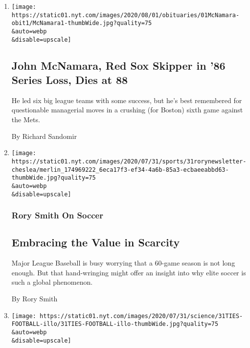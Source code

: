 \begin{enumerate}
\def\labelenumi{\arabic{enumi}.}
\item
  \href{/2020/07/31/sports/baseball/john-mcnamara-dead.html}{}

  \texttt{[image: https://static01.nyt.com/images/2020/08/01/obituaries/01McNamara-obit1/McNamara1-thumbWide.jpg?quality=75\\\&auto=webp\\\&disable=upscale]}

  \hypertarget{john-mcnamara-red-sox-skipper-in-86-series-loss-dies-at-88}{%
  \subsection{John McNamara, Red Sox Skipper in '86 Series Loss, Dies at
  88}\label{john-mcnamara-red-sox-skipper-in-86-series-loss-dies-at-88}}

  He led six big league teams with some success, but he's best
  remembered for questionable managerial moves in a crushing (for
  Boston) sixth game against the Mets.

  By Richard Sandomir
\item
  \href{/2020/07/31/sports/soccer/soccer-baseball.html}{}

  \texttt{[image: https://static01.nyt.com/images/2020/07/31/sports/31rorynewsletter-cheslea/merlin\_174969222\_6eca17f3-ef34-4a6b-85a3-ecbaeeabbd63-thumbWide.jpg?quality=75\\\&auto=webp\\\&disable=upscale]}

  \hypertarget{rory-smith-on-soccer}{%
  \subsubsection{Rory Smith On Soccer}\label{rory-smith-on-soccer}}

  \hypertarget{embracing-the-value-in-scarcity}{%
  \subsection{Embracing the Value in
  Scarcity}\label{embracing-the-value-in-scarcity}}

  Major League Baseball is busy worrying that a 60-game season is not
  long enough. But that hand-wringing might offer an insight into why
  elite soccer is such a global phenomenon.

  By Rory Smith
\item
  \href{/2020/07/31/well/family/gambling-on-college-football-almost-fixed-my-dysfunctional-family.html}{}

  \texttt{[image: https://static01.nyt.com/images/2020/07/31/science/31TIES-FOOTBALL-illo/31TIES-FOOTBALL-illo-thumbWide.jpg?quality=75\\\&auto=webp\\\&disable=upscale]}


\end{enumerate}
